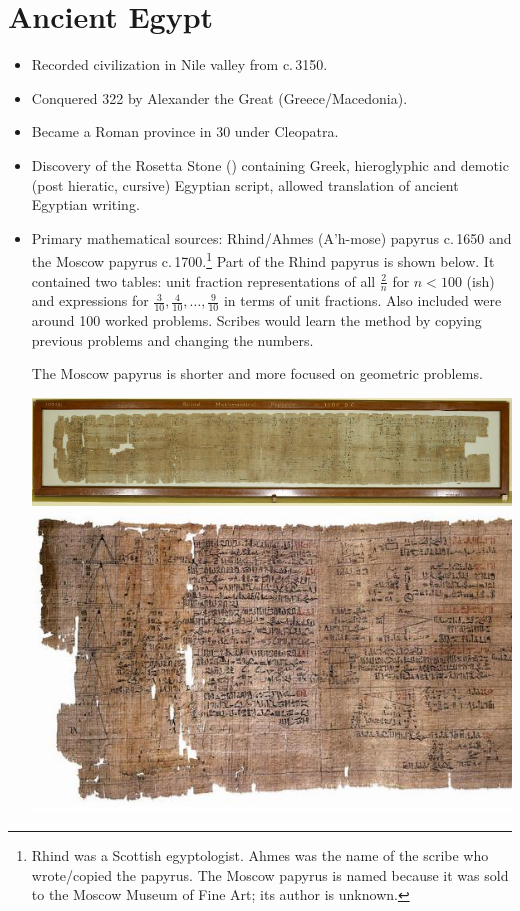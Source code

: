 \graphicspath{{1egypt/pics/}}

\section{Ancient Egypt}


\begin{itemize}\itemsep0pt
  \item Recorded civilization in Nile valley from c.\,3150\BC.
  \item Conquered 322\BC{} by Alexander the Great (Greece/Macedonia).
  \item Became a Roman province in 30\BC{} under Cleopatra. 
  \item Discovery of the Rosetta Stone () containing Greek, hieroglyphic and demotic (post hieratic, cursive) Egyptian script, allowed translation of ancient Egyptian writing.
  \item Primary mathematical sources: Rhind/Ahmes (A'h-mose) papyrus c.\,1650\BC{} and the Moscow papyrus c.\,1700\BC.\footnote{Rhind was a Scottish egyptologist. Ahmes was the name of the scribe who wrote/copied the papyrus. The Moscow papyrus is named because it was sold to the Moscow Museum of Fine Art; its author is unknown.} Part of the Rhind papyrus is shown below. It contained two tables: unit fraction representations of all $\frac 2n$ for $n<100$ (ish) and expressions for $\frac 3{10},\frac 4{10},\ldots,\frac 9{10}$ in terms of unit fractions. Also included were around 100 worked problems. Scribes would learn the method by copying previous problems and changing the numbers.\par
  The Moscow papyrus is shorter and more focused on geometric problems.
  \begin{center}
  	\includegraphics[scale=0.4]{rhindwhole.jpg}\\
  	\includegraphics[scale=0.8]{Rhind_Mathematical_Papyrus.jpg}

\end{center}
\end{itemize}
